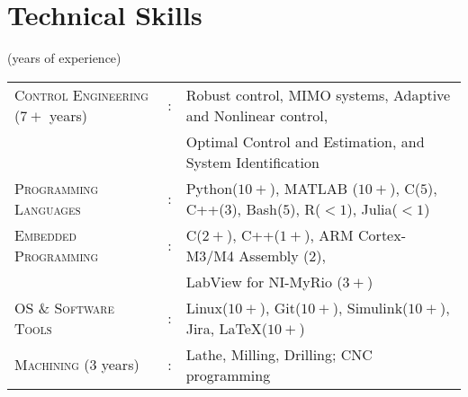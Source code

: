 \documentclass[letterpaper,10pt]{article}
\begin{document}
\section{Technical Skills}
(years of experience)
\begin{tabular}{l c l}
    \textsc{Control Engineering} ($7+$ years) &:& Robust control, MIMO systems, Adaptive and Nonlinear control, \\
    & & Optimal Control and Estimation, and System Identification\\
	\textsc{Programming Languages}&:& Python($10+$), MATLAB ($10+$), C($5$), C++($3$), Bash($5$), R($<1$), Julia($<1$)\\
    \textsc{Embedded Programming}&:& C($2+$), C++($1+$), ARM Cortex-M3/M4 Assembly ($2$), \\ & &LabView for NI-MyRio ($3+$)\\
	\textsc{OS \& Software Tools}&:& Linux($10+$), Git($10+$), Simulink($10+$), Jira, \LaTeX ($10+$)\\
	\textsc{Machining} (3 years) &:& Lathe, Milling, Drilling; CNC programming\\
\end{tabular}
\end{document}
